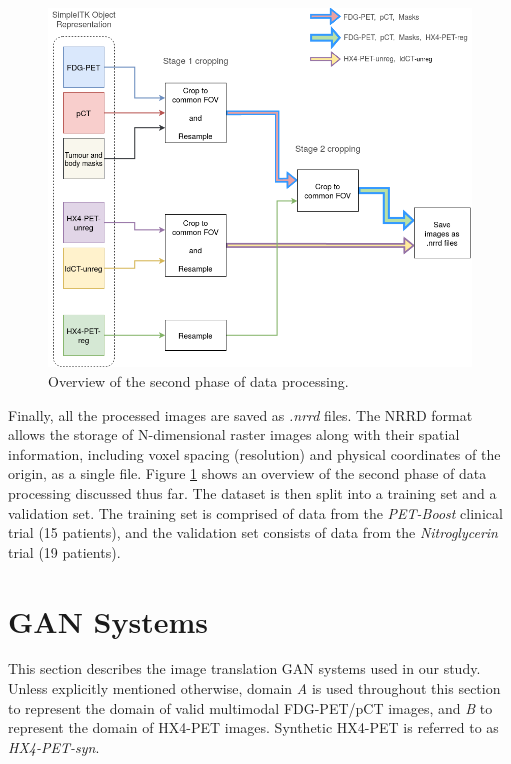 \begin{figure}[h!]
    \centering
    \includegraphics[width=0.8\linewidth]{figures/Data/data_processing_overview-step_2.png}
    \caption{Overview of the second phase of data processing.}
    \label{fig:data_proc_overview_2}
\end{figure}

Finally, all the processed images are saved as \textit{.nrrd} files. The NRRD format allows the storage of N-dimensional raster images along with their spatial information, including voxel spacing (resolution) and physical coordinates of the origin, as a single file. Figure \ref{fig:data_proc_overview_2} shows an overview of the second phase of data processing discussed thus far. The dataset is then split into a training set and a validation set. The training set is comprised of data from the \textit{PET-Boost} clinical trial (15 patients), and the validation set consists of data from the \textit{Nitroglycerin} trial (19 patients). 



\section{GAN Systems}
\label{GAN_Systems}
This section describes the image translation GAN systems used in our study. Unless explicitly mentioned otherwise, domain \textit{A} is used throughout this section to represent the domain of valid multimodal FDG-PET/pCT images, and \textit{B} to represent the domain of HX4-PET images. Synthetic HX4-PET is referred to as \textit{HX4-PET-syn}.


